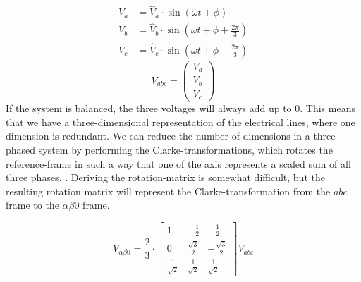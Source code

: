 \begin{equation}
\begin{aligned}
    \label{eq:three_phase}
        V_a &= \hat{V}_a \cdot \sin{(\omega t + \phi )}\\
        V_b &= \hat{V}_b \cdot \sin{(\omega t + \phi + \frac{2\pi}{3} )}\\
        V_c &= \hat{V}_c \cdot \sin{(\omega t + \phi - \frac{2\pi}{3} )}
    \end{aligned}
\end{equation}
\begin{equation}
    V_{abc} = 
    \begin{pmatrix}
        V_a \\ 
        V_b \\ 
        V_c
    \end{pmatrix}
\end{equation}{}
If the system is balanced, the three voltages will always add up to 0. This means that we have a three-dimensional representation of the electrical lines, where one dimension is redundant. We can reduce the number of dimensions in a three-phased system by performing the Clarke-transformations, which rotates the reference-frame in such a way that one of the axis represents a scaled sum  of all three phases.  \cite{Clarke_transform_source}. Deriving the rotation-matrix is somewhat difficult, but the resulting rotation matrix will represent the Clarke-transformation from the $abc$ frame to the $\alpha\beta 0$ frame. 


\begin{equation}{}
    \label{eq:Clarke_transform}
    V_{\alpha\beta 0} = \frac{2}{3}
    \cdot
    \begin{bmatrix}
        1                   & -\frac{1}{2}          & -\frac{1}{2} \\
        0                   & \frac{\sqrt{3}}{2}    & -\frac{\sqrt{3}}{2} \\
        \frac{1}{\sqrt{2}}  & \frac{1}{\sqrt{2}}    & \frac{1}{\sqrt{2}}
    \end{bmatrix}
    V_{abc}
\end{equation}{}


